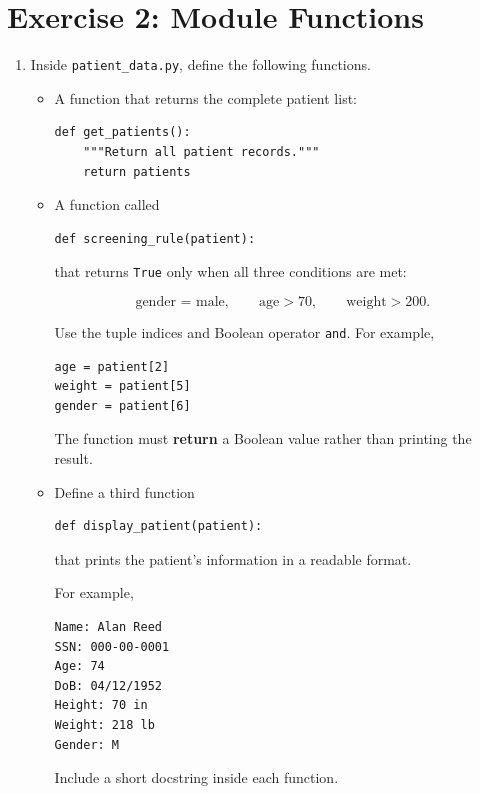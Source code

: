 \documentclass{article}
\begin{document}
\section{Exercise 2: Module Functions}

\begin{enumerate}

\item Inside \texttt{patient\_data.py}, define the following
functions.

\begin{itemize}

\item A function that returns the complete patient list:

\begin{verbatim}
def get_patients():
    """Return all patient records."""
    return patients
\end{verbatim}

\item A function called

\begin{verbatim}
def screening_rule(patient):
\end{verbatim}

that returns \texttt{True} only when all three conditions are met:

\[
\text{gender = male},
\qquad
\text{age} > 70,
\qquad
\text{weight} > 200.
\]

Use the tuple indices and Boolean operator \texttt{and}.
For example,

\begin{verbatim}
age = patient[2]
weight = patient[5]
gender = patient[6]
\end{verbatim}

The function must \textbf{return} a Boolean value rather than
printing the result.

\item Define a third function

\begin{verbatim}
def display_patient(patient):
\end{verbatim}

that prints the patient's information in a readable format.

For example,

\begin{verbatim}
Name: Alan Reed
SSN: 000-00-0001
Age: 74
DoB: 04/12/1952
Height: 70 in
Weight: 218 lb
Gender: M
\end{verbatim}

Include a short docstring inside each function.

\end{itemize}
\end{enumerate}
\end{document}
